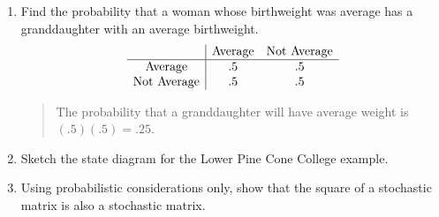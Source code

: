 \documentclass{hw}
\begin{document}
\begin{enumerate}
\item Find the probability that a woman whose birthweight was average has a granddaughter with an
average birthweight.
\[
\begin{array}{c | c c}
& \text{Average} & \text{Not Average}\\
\hline
\text{Average} & .5 & .5\\
\text{Not Average} & .5 & .5
\end{array}
\]
\begin{quote}
The probability that a granddaughter will have average weight is $(.5)(.5)=.25$.
\end{quote}

\item Sketch the state diagram for the Lower Pine Cone College example.
\begin{center}
\end{center}

\setcounter{enumi}{10}

\item Using probabilistic considerations only, show that the square of a stochastic matrix is also a
stochastic matrix.
\begin{quote}

\end{quote}
\end{enumerate}
\end{document}
